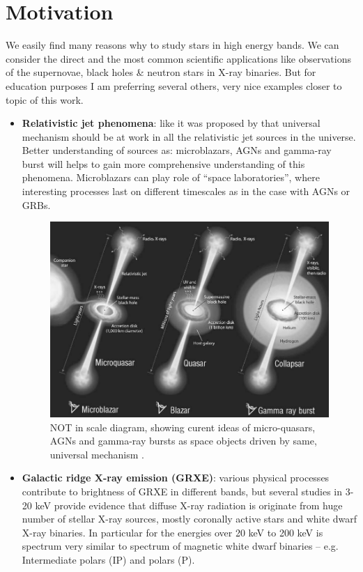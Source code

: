\documentclass[oneside,a4paper,11pt]{report}
\begin{document}
\section{Motivation}
We easily find many reasons why to study stars in high energy bands.  
We can consider the direct and the most common scientific applications like observations of 
the supernovae, black holes \& neutron stars in X-ray binaries. But for education purposes 
I am preferring several others, very nice examples closer to topic of this work.  

\begin{itemize}
 \item \textbf{Relativistic jet phenomena}: like it was proposed by \citet{mirabel:1} that universal 
mechanism should be at work in all the relativistic jet sources in the universe. Better understanding 
of sources as: microblazars, AGNs and gamma-ray burst will helps to gain more comprehensive 
understanding of this phenomena. Microblazars can play role of “space laboratories”, where interesting
 processes last on different timescales as in the case with AGNs or GRBs.   

\begin{figure}[!hbt]
\centering
\includegraphics[totalheight=8.5cm]{microblazars}
\caption{NOT in scale diagram, showing curent ideas of micro-quasars, AGNs and gamma-ray
bursts as space objects driven by same, universal mechanism  \citet{mirabel:1}. }
\label{microblazar} 
\end{figure}

 \item \textbf{Galactic ridge X-ray emission (GRXE)}: various physical processes contribute to 
brightness of GRXE in different bands, but several studies in 3-20 keV provide evidence that diffuse 
X-ray radiation is originate from huge number of stellar X-ray sources, mostly coronally active stars
 and white dwarf X-ray binaries. In particular for the energies over 20 keV to 200 keV is spectrum 
very similar to spectrum  of magnetic white dwarf binaries – e.g. Intermediate polars (IP) and polars (P).  
\citet{2007A&A...463..957K}
 

\end{itemize}
\end{document}
